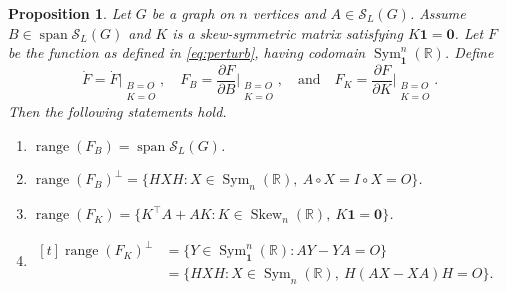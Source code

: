 \documentclass{article}
\newtheorem{proposition}[theorem]{Proposition}
\theoremstyle{definition}
\newcommand{\trans}{^\top}
\newcommand{\bzero}{\mathbf{0}}
\newcommand{\bone}{\mathbf{1}}
\newcommand{\range}{\operatorname{range}}
\newcommand{\vspan}{\operatorname{span}}
\newcommand{\msym}[1][n]{\operatorname{Sym}_{#1}(\mathbb{R})}
\newcommand{\msymz}[1][n]{\operatorname{Sym}_{\bone}^{#1}(\mathbb{R})}
\newcommand{\mskew}[1][n]{\operatorname{Skew}_{#1}(\mathbb{R})}
\newcommand{\mptn}{\mathcal{S}}
\begin{document}
\begin{proposition}
\label{prop:range} Let $G$ be a graph on $n$ vertices and $A\in\mptn_L(G)$.
Assume $B \in \vspan\mptn_L(G)$ and $K$ is a skew-symmetric matrix satisfying $K\bone = \bzero$.
Let $F$ be the function as defined in \cref{eq:perturb}, having codomain $\msymz$.  Define
\[
    \dot{F} = \dot{F}\big|_{\substack{B = O\\K = O}},\quad 
    F_B = \frac{\partial F}{\partial B} \big|_{\substack{B = O\\K = O}}, \quad\text{and}\quad 
    F_K = \frac{\partial F}{\partial K} \big|_{\substack{B = O\\K = O}}.
\]
Then the following statements hold.
\begin{enumerate}[label={\rm(\arabic*)}]
\item $\range(F_B) = \vspan\mptn_L(G)$. \label{item:range-fb}
\item $\range(F_B)^{\perp} = \{HXH: X\in\msym,\ A\circ X = I \circ X = O\}$. \label{item:range-fbp}
\item $\range(F_K) = \{K\trans A + AK: K\in\mskew,\ K\bone = \bzero\}$. \label{item:range-fk}
\item $\begin{aligned}[t]
    \range(F_K)^{\perp} &= \{Y \in \msymz: AY - YA = O\} \\
    &= \{HXH: X\in\msym,\ H(AX - XA)H = O\}.
\end{aligned}$ \label{item:range-fkp}
\end{enumerate}
\end{proposition}
\end{document}
